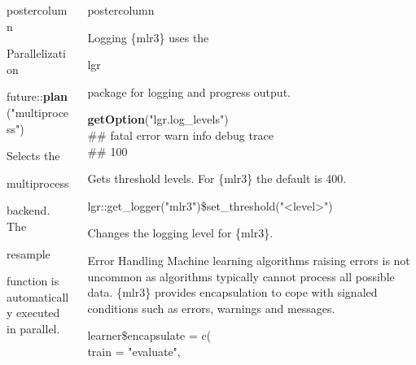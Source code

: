 \documentclass{beamer}
\newlength{\columnheight} %
\newcommand{\codeinline}[1]{\begin{codeboxinline}#1\end{codeboxinline}}
\begin{document}
\begin{withoutheader}
\begin{frame}[fragile]{}
\begin{columns}
\begin{column}{.245\textwidth}
\begin{beamercolorbox}[center]{postercolumn}
\begin{minipage}{.98\textwidth}
{\begin{myblock}{Parallelization}
						\\
						\begin{codebox}
							future::\textbf{plan}("multiprocess")
						\end{codebox}
						Selects the \codeinline{multiprocess} backend. The \codeinline{resample} function is automatically executed in parallel.
					\end{myblock}
					\vfill
					}
				\end{minipage}
			\end{beamercolorbox}
		\end{column}
		\begin{column}{.245\textwidth}
			\begin{beamercolorbox}[center]{postercolumn}
				\begin{minipage}{.98\textwidth}
					\parbox[t][\columnheight]{\textwidth}{
						\begin{myblock}{Logging}
							\{mlr3\} uses the \codeinline{lgr} package for logging and progress output.
							\\
							\begin{codeboxmultiline}[width=23.1cm]
								\textbf{getOption}("lgr.log\_levels")\\
								\#\# fatal error  warn  info debug trace\\ 
								\#\# 100 \space{} \space{}  \space 500 \space{}
							\end{codeboxmultiline}
							Gets threshold levels. For \{mlr3\} the default is 400. 
							\\
							\begin{codeboxmultiline}[width=25cm]
								\footnotesize{
								lgr::get\_logger("mlr3")\$set\_threshold("<level>")
							}
							\end{codeboxmultiline}
							Changes the logging level for \{mlr3\}.
						\end{myblock}
						\begin{myblock}{Error Handling}
							Machine learning algorithms raising errors is not uncommon as algorithms typically cannot process all possible data. \{mlr3\} provides encapsulation to cope with signaled conditions such as errors, warnings and messages.
							\\
							\begin{codeboxmultiline}[width=16cm]
								learner\$encapsulate = c(\\
								\hspace*{1ex} train = "evaluate", \\

\end{codeboxmultiline}
\end{myblock}}
\end{minipage}
\end{beamercolorbox}
\end{column}
\end{columns}
\end{frame}
\end{withoutheader}
\end{document}
